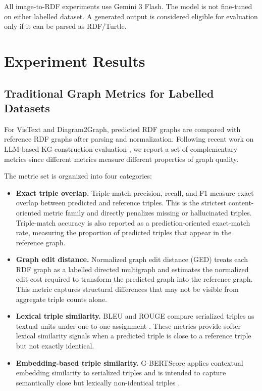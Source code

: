 \documentclass[preprint,12pt]{elsarticle}
\begin{document}
All image-to-RDF experiments use Gemini 3 Flash. The model is not fine-tuned on either labelled dataset. A generated output is considered eligible for evaluation only if it can be parsed as RDF/Turtle.

\section{Experiment Results}\label{sec:evaluation}

\subsection{Traditional Graph Metrics for Labelled Datasets}\label{subsec:traditional_graph_metrics}

For VisText and Diagram2Graph, predicted RDF graphs are compared with reference RDF graphs after parsing and normalization. Following recent work on LLM-based KG construction evaluation \citep{ghanemcruz2025kgc}, we report a set of complementary metrics since different metrics measure different properties of graph quality.

The metric set is organized into four categories:

\begin{itemize}
    \item \textbf{Exact triple overlap.} Triple-match precision, recall, and F1 measure exact overlap between predicted and reference triples. This is the strictest content-oriented metric family and directly penalizes missing or hallucinated triples. Triple-match accuracy is also reported as a prediction-oriented exact-match rate, measuring the proportion of predicted triples that appear in the reference graph.
    \item \textbf{Graph edit distance.} Normalized graph edit distance (GED) treats each RDF graph as a labelled directed multigraph and estimates the normalized edit cost required to transform the predicted graph into the reference graph. This metric captures structural differences that may not be visible from aggregate triple counts alone.
    \item \textbf{Lexical triple similarity.} BLEU and ROUGE compare serialized triples as textual units under one-to-one assignment \citep{bleu,rouge}. These metrics provide softer lexical similarity signals when a predicted triple is close to a reference triple but not exactly identical.
    \item \textbf{Embedding-based triple similarity.} G-BERTScore applies contextual embedding similarity to serialized triples and is intended to capture semantically close but lexically non-identical triples \citep{bertscore}.
\end{itemize}
\end{document}

